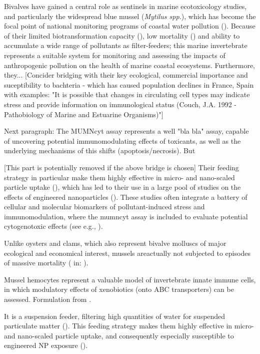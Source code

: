 Bivalves have gained a central role as sentinels in marine ecotoxicology studies, and particularly the widespread blue mussel (\emph{Mytilus spp.}), which has become the focal point of national monitoring programs of coastal water pollution (\cite{Goldberg1975, Beyer2017b, Cajarville2000}). Because of their limited biotransformation capacity (\cite{Beyer2017b}), low mortality (\cite{Ale2019}) and ability to accumulate a wide range of pollutants as filter-feeders; this marine invertebrate represents a suitable system for monitoring and assessing the impacts of anthropogenic pollution on the health of marine coastal ecosystems. Furthermore, they... [Concider bridging with their key ecological, commercial importance and suceptibility to bachteria - which has caused population declines in France, Spain with examples: "It is possible that changes in circulating cell types may indicate stress and provide information on immunological status (Couch, J.A. 1992 - Pathobiology of Marine and Estuarine Organisms)"]

Next paragraph: The MUMNcyt assay represents a well "bla bla" assay, capable of uncovering potential immunomodulating effects of toxicants, as well as the underlying mechanisms of this shifts (apoptosis/necrosis). But

[This part is potentially removed if the above bridge is chosen] Their feeding strategy in particular make them highly effective in micro- and nano-scaled particle uptake (\cite{Canesi2012}), which has led to their use in a large pool of studies on the effects of engineered nanoparticles (\cite{Rocha2015}). These studies often integrate a battery of cellular and molecular biomarkers of pollutant-induced stress and immunomodulation, where the \acrshort{mumncyt} assay is included to evaluate potential cytogenotoxic effects (see e.g., \cite{Rocha2014, Ruiz2015}).


Unlike oysters and clams, which also represent bivalve molluscs of major ecological and economical interest, mussels areactually not subjected to episodes of massive mortality (\cite{Costa2009} in: \cite{Rioult2014}).

Mussel hemocytes represent a valuable model of invertebrate innate immune cells, in which modulatory effects of xenobiotics (onto ABC transporters) can be assessed. Formulation from \cite{Rioult2014}.


\newpage

It is a suspension feeder, filtering high quantities of water for suspended particulate matter (\cite{Beyer2017b}). This feeding strategy makes them highly effective in micro- and nano-scaled particle uptake, and consequently especially susceptible to engineered NP exposure (\cite{Canesi2012}).




